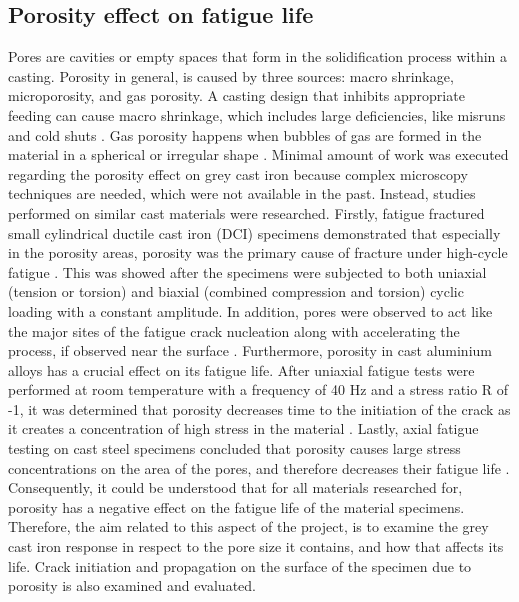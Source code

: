 \documentclass[11pt,a4paper]{article}
\begin{document}
\subsection{Porosity effect on fatigue life}
Pores are cavities or empty spaces that form in the solidification process within a casting. Porosity in general, is caused by three sources: macro shrinkage, microporosity, and gas porosity. A casting design that inhibits appropriate feeding can cause macro shrinkage, which includes large deficiencies, like misruns and cold shuts \cite{boileau2001effect}. Gas porosity happens when bubbles of gas are formed in the material in a spherical or irregular shape \cite{Frant}. Minimal amount of work was executed regarding the porosity effect on grey cast iron because complex microscopy techniques are needed, which were not available in the past. Instead, studies performed on similar cast materials were researched. Firstly, fatigue fractured small cylindrical ductile cast iron (DCI) specimens demonstrated that especially in the porosity areas, porosity was the primary cause of fracture under high-cycle fatigue \cite{https://doi.org/10.1111/ffe.13783}. This was showed after the specimens were subjected to both uniaxial (tension or torsion) and biaxial (combined compression and torsion) cyclic loading with a constant amplitude. In addition, pores were observed to act like the major sites of the fatigue crack nucleation along with accelerating the process, if observed near the surface \cite{kainzinger2013influence}. Furthermore, porosity in cast aluminium alloys has a crucial effect on its fatigue life. After uniaxial fatigue tests were performed at room temperature with a frequency of 40 Hz and a stress ratio R of -1, it was determined that porosity decreases time to the initiation of the crack as it creates a concentration of high stress in the material \cite{boileau2001effect}. Lastly, axial fatigue testing on cast steel specimens concluded that porosity causes large stress concentrations on the area of the pores, and therefore decreases their fatigue life \cite{prediction}. Consequently, it could be understood that for all materials researched for, porosity has a negative effect on the fatigue life of the material specimens. Therefore, the aim related to this aspect of the project, is to examine the grey cast iron response in respect to the pore size it contains, and how that affects its life. Crack initiation and propagation on the surface of the specimen due to porosity is also examined and evaluated.
\end{document}
